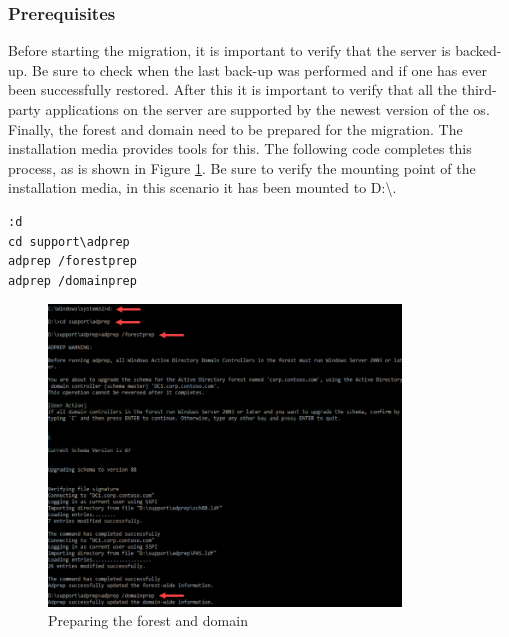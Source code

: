 \subsubsection{Prerequisites}
Before starting the migration, it is important to verify that the server is backed-up. Be sure to check when the last back-up was performed and if one has ever been successfully restored. After this it is important to verify that all the third-party applications on the server are supported by the newest version of the \acrshort{os}. Finally, the forest and domain need to be prepared for the migration. The installation media provides tools for this. The following code completes this process, as is shown in Figure \ref{fig:inplace1}. Be sure to verify the mounting point of the installation media, in this scenario it has been mounted to D:\textbackslash .

\begin{lstlisting}[breaklines]
:d
cd support\adprep
adprep /forestprep
adprep /domainprep
\end{lstlisting}
\begin{figure}[h]
	\includegraphics[height=8cm]{img/In-Place_WS_1.png}
	\captionsetup{width=0.8\linewidth}
	\centering		
	\caption{Preparing the forest and domain}
	\label{fig:inplace1}
\end{figure}

